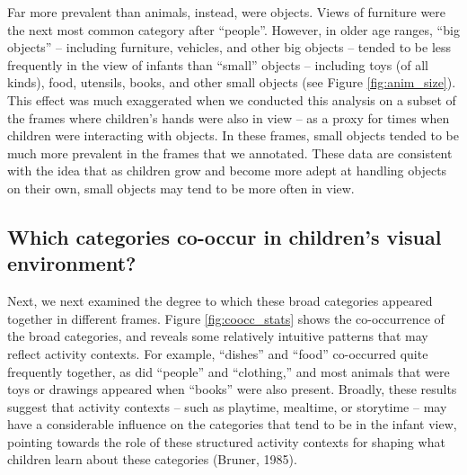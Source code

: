 \documentclass[10pt, letterpaper]{article}
\begin{document}
Far more prevalent than animals, instead, were objects. Views of
furniture were the next most common category after ``people''. However,
in older age ranges, ``big objects'' -- including furniture, vehicles,
and other big objects -- tended to be less frequently in the view of
infants than ``small'' objects -- including toys (of all kinds), food,
utensils, books, and other small objects (see Figure
\ref{fig:anim_size}). This effect was much exaggerated when we conducted
this analysis on a subset of the frames where children's hands were also
in view -- as a proxy for times when children were interacting with
objects. In these frames, small objects tended to be much more prevalent
in the frames that we annotated. These data are consistent with the idea
that as children grow and become more adept at handling objects on their
own, small objects may tend to be more often in view.

\hypertarget{which-categories-co-occur-in-childrens-visual-environment}{%
\subsection{Which categories co-occur in children's visual
environment?}\label{which-categories-co-occur-in-childrens-visual-environment}}

Next, we next examined the degree to which these broad categories
appeared together in different frames. Figure \ref{fig:coocc_stats}
shows the co-occurrence of the broad categories, and reveals some
relatively intuitive patterns that may reflect activity contexts. For
example, ``dishes'' and ``food'' co-occurred quite frequently together,
as did ``people'' and ``clothing,'' and most animals that were toys or
drawings appeared when ``books'' were also present. Broadly, these
results suggest that activity contexts -- such as playtime, mealtime, or
storytime -- may have a considerable influence on the categories that
tend to be in the infant view, pointing towards the role of these
structured activity contexts for shaping what children learn about these
categories (Bruner, 1985).
\end{document}
